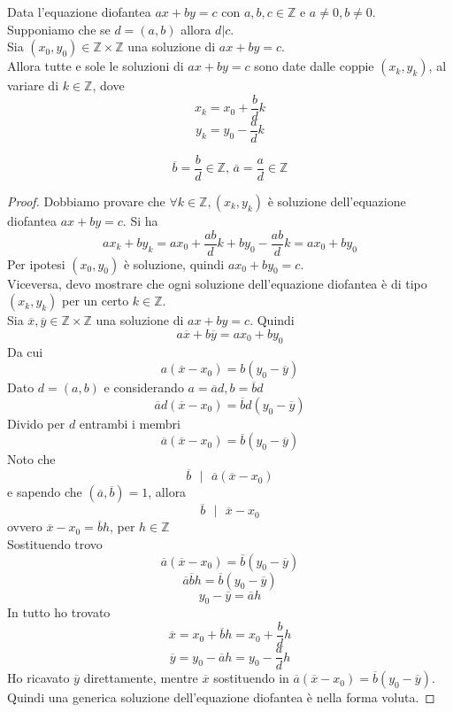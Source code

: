 \documentclass[a4paper,12pt, oneside]{book}
\begin{document}
	\begin{teorema}
		Data l'equazione diofantea $ax+by=c$ con $a,b,c \in \mathbb{Z}$ e $a \not = 0, b \not = 0$.\\
		Supponiamo che se $d = (a,b)$ allora $d|c$.\\
		Sia $(x_0,y_0) \in \mathbb{Z} \times \mathbb{Z}$ una soluzione di $ax+by=c$.\\
		Allora tutte e sole le soluzioni di $ax+by=c$ sono date dalle coppie $(x_k,y_k)$, al variare di $k \in \mathbb{Z}$, dove
		$$x_k = x_0 + \frac{b}{d}k$$
		$$y_k = y_0 - \frac{a}{d}k$$
		\begin{nota}
			$$\overline{b} = \frac{b}{d} \in \mathbb{Z} \mbox{, } \overline{a} = \frac{a}{d} \in \mathbb{Z}$$
		\end{nota}
		\begin{proof}
			Dobbiamo provare che $ \forall k \in \mathbb{Z}, (x_k,y_k)$ è soluzione dell'equazione diofantea $ax+by=c$.
			Si ha
			$$ax_k+by_k = ax_0 + \frac{ab}{d}k + by_0 - \frac{ab}{d}k = ax_0+by_0$$
			Per ipotesi $(x_0,y_0)$ è soluzione, quindi $ax_0+by_0=c$.\\
			
			Viceversa, devo mostrare che ogni soluzione dell'equazione diofantea è di tipo $(x_k,y_k)$ per un certo $k \in \mathbb{Z}$.\\
			Sia $\overline{x}, \overline{y} \in \mathbb{Z} \times \mathbb{Z}$ una soluzione di $ax+by=c$. Quindi
			$$a\overline{x}+b\overline{y} = ax_0+by_0$$
			Da cui
			$$a(\overline{x}-x_0) = b(y_0-\overline{y})$$
			Dato $d=(a,b)$ e considerando $a=\overline{a}d, b=\overline{b}d$
			$$\overline{a}d(\overline{x}-x_0) = \overline{b}d(y_0-\overline{y})$$
			Divido per $d$ entrambi i membri
			$$\overline{a}(\overline{x}-x_0) = \overline{b}(y_0-\overline{y})$$
			Noto che
			$$\overline{b} \mbox{ } | \mbox{ } \overline{a}(\overline{x}-x_0)$$
			e sapendo che $(\overline{a}, \overline{b})=1$, allora
			$$\overline{b} \mbox{ } | \mbox{ } \overline{x}-x_0$$
			ovvero $\overline{x}-x_0 =\overline{b}h$, per $h \in \mathbb{Z}$\\
			Sostituendo trovo
			$$\overline{a}(\overline{x}-x_0) = \overline{b}(y_0-\overline{y})$$
			$$\overline{a}\overline{b}h = \overline{b}(y_0-\overline{y})$$
			$$y_0 - \overline{y} = \overline{a}h$$
			In tutto ho trovato
			$$\overline{x} = x_0+\overline{b}h=x_0+\frac{b}{d}h$$
			$$\overline{y} = y_0-\overline{a}h=y_0-\frac{a}{d}h$$
			Ho ricavato $\overline{y}$ direttamente, mentre $\overline{x}$ sostituendo in $\overline{a}(\overline{x}-x_0) = \overline{b}(y_0-\overline{y})$.\\
			Quindi una generica soluzione dell'equazione diofantea è nella forma voluta.
		\end{proof}
	\end{teorema}
\end{document}
